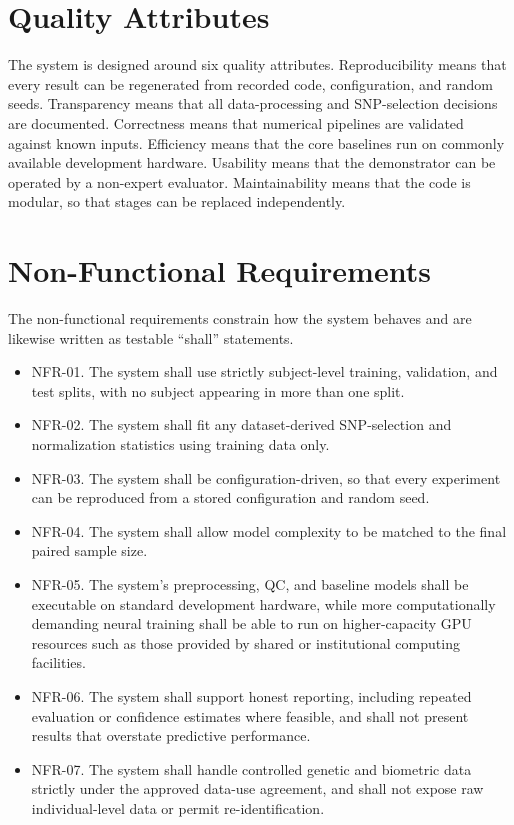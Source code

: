 \section{Quality Attributes}
The system is designed around six quality attributes. Reproducibility means that every result can be regenerated from recorded code, configuration, and random seeds. Transparency means that all data-processing and SNP-selection decisions are documented. Correctness means that numerical pipelines are validated against known inputs. Efficiency means that the core baselines run on commonly available development hardware. Usability means that the demonstrator can be operated by a non-expert evaluator. Maintainability means that the code is modular, so that stages can be replaced independently.

\section{Non-Functional Requirements}
The non-functional requirements constrain how the system behaves and are likewise written as testable ``shall'' statements.
\begin{itemize}
\item NFR-01. The system shall use strictly subject-level training, validation, and test splits, with no subject appearing in more than one split.
\item NFR-02. The system shall fit any dataset-derived SNP-selection and normalization statistics using training data only.
\item NFR-03. The system shall be configuration-driven, so that every experiment can be reproduced from a stored configuration and random seed.
\item NFR-04. The system shall allow model complexity to be matched to the final paired sample size.
\item NFR-05. The system's preprocessing, QC, and baseline models shall be executable on standard development hardware, while more computationally demanding neural training shall be able to run on higher-capacity GPU resources such as those provided by shared or institutional computing facilities.
\item NFR-06. The system shall support honest reporting, including repeated evaluation or confidence estimates where feasible, and shall not present results that overstate predictive performance.
\item NFR-07. The system shall handle controlled genetic and biometric data strictly under the approved data-use agreement, and shall not expose raw individual-level data or permit re-identification.
\end{itemize}

